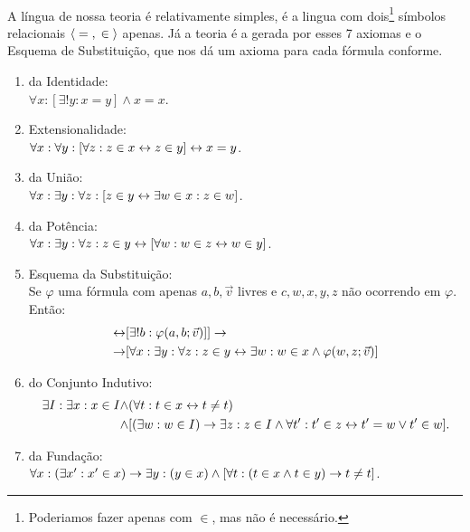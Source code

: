     \paragraph{}
        A língua de nossa teoria é relativamente simples, é a lingua com 
        dois\footnote{
            Poderiamos fazer apenas com ${}\in$, mas não é necessário.
        } símbolos relacionais $\TUPLE{{}={}}{{}\in{}}$ apenas. Já a 
        teoria é a gerada por esses 7 axiomas e o Esquema de Substituição, 
        que nos dá um axioma para cada fórmula conforme.
    \begin{enumerate}[label=\arabic*. Ax.]
        \item da Identidade:\\
            $\forall x: [\exists! y: x=y] \land x=x$.
        \item Extensionalidade:\\
            $\forall x:\forall y:[\forall z: z\in x \leftrightarrow z \in y]\leftrightarrow x = y$.
        \item da União:\\
            $\forall x:\exists y: \forall z: [z\in y\leftrightarrow\exists w\in x: z\in w]$.
        \item da Potência:\\
            $\forall x:\exists y: \forall z: z\in y \leftrightarrow [\forall w: w\in z\leftrightarrow w\in y]$.
        \item Esquema da Substituição:\\
            Se $\varphi$ uma fórmula com apenas $a,b,\vec{v}$ livres e $c,w,x,y,z$ não ocorrendo 
            em $\varphi$. Então:
            \begin{align*}
                [\forall\vec{v}:\forall a:[\exists b:\varphi(a,b;\vec{v})]\bim&[\exists!b:\varphi(a,b;\vec{v})]]\rar\\
                \rar&[\forall x:\exists y: \forall z: z\in y \bim \exists w: w\in x\land \varphi(w,z;\vec{v})]
            \end{align*}
        \item do Conjunto Indutivo:
        \begin{align*}
            \exists I:\exists x: x\in I \land&(\forall t: t\in x   \leftrightarrow t\not=t)\\
                                        \land&[(\exists w: w\in I) \rightarrow \exists z:z\in I \land \forall t': t'\in z \leftrightarrow t'=w\lor t'\in w].
        \end{align*}
        \item da Fundação:\\
            $\forall x:(\exists x': x'\in x)\rightarrow\exists y: (y\in x)\land[\forall t: (t\in x\land t\in y)\rightarrow t\not=t]$.
    \end{enumerate}
